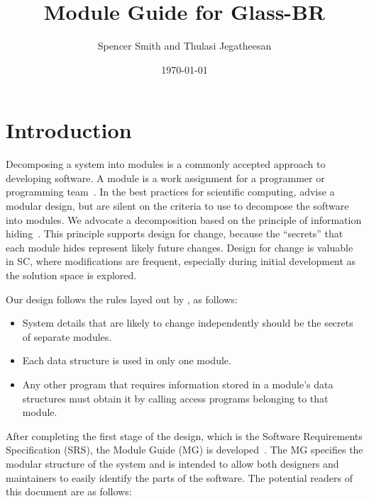 \documentclass[12pt]{article}
\begin{document}
\title{Module Guide for Glass-BR} 
\author{Spencer Smith and Thulasi Jegatheesan}
\date{\today}
	
\maketitle

\tableofcontents

\newpage

\section{Introduction}

Decomposing a system into modules is a commonly accepted approach to developing
software.  A module is a work assignment for a programmer or programming
team~\citep{ParnasEtAl1984}.  In the best practices for scientific computing,
\citet{WilsonEtAl2013} advise a modular design, but are silent on the criteria
to use to decompose the software into modules.  We advocate a decomposition
based on the principle of information hiding~\citep{Parnas1972a}.  This
principle supports design for change, because the ``secrets'' that each module
hides represent likely future changes.  Design for change is valuable in SC,
where modifications are frequent, especially during initial development as the
solution space is explored.  

Our design follows the rules layed out by \citet{ParnasEtAl1984}, as follows:
\begin{itemize}
\item System details that are likely to change independently should be the
  secrets of separate modules.
\item Each data structure is used in only one module.
\item Any other program that requires information stored in a module's data
  structures must obtain it by calling access programs belonging to that module.
\end{itemize}

After completing the first stage of the design, which is the Software Requirements
Specification (SRS), the Module Guide (MG) is developed~\citep{ParnasEtAl1984}. 
The MG
specifies the modular structure of the system and is intended to allow both
designers and maintainers to easily identify the parts of the software.  The
potential readers of this document are as follows:
\end{document}
